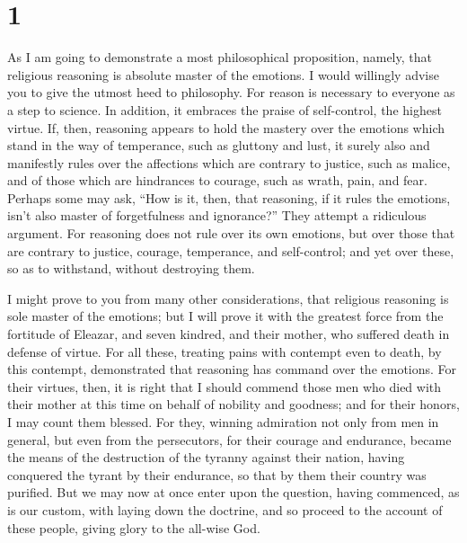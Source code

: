 \hypertarget{section}{%
\section{1}\label{section}}

 As I am going to demonstrate a most philosophical
proposition, namely, that religious reasoning is absolute master of the
emotions. I would willingly advise you to give the utmost heed to
philosophy.  For reason is necessary to everyone as a step
to science. In addition, it embraces the praise of self-control, the
highest virtue.  If, then, reasoning appears to hold the
mastery over the emotions which stand in the way of temperance, such as
gluttony and lust,  it surely also and manifestly rules over
the affections which are contrary to justice, such as malice, and of
those which are hindrances to courage, such as wrath, pain, and fear.
 Perhaps some may ask, ``How is it, then, that reasoning, if
it rules the emotions, isn't also master of forgetfulness and
ignorance?'' They attempt a ridiculous argument.  For
reasoning does not rule over its own emotions, but over those that are
contrary to justice, courage, temperance, and self-control; and yet over
these, so as to withstand, without destroying them.

 I might prove to you from many other considerations, that
religious reasoning is sole master of the emotions;  but I
will prove it with the greatest force from the fortitude of Eleazar, and
seven kindred, and their mother, who suffered death in defense of
virtue.  For all these, treating pains with contempt even to
death, by this contempt, demonstrated that reasoning has command over
the emotions.  For their virtues, then, it is right that I
should commend those men who died with their mother at this time on
behalf of nobility and goodness; and for their honors, I may count them
blessed.  For they, winning admiration not only from men in
general, but even from the persecutors, for their courage and endurance,
became the means of the destruction of the tyranny against their nation,
having conquered the tyrant by their endurance, so that by them their
country was purified.  But we may now at once enter upon
the question, having commenced, as is our custom, with laying down the
doctrine, and so proceed to the account of these people, giving glory to
the all-wise God.

